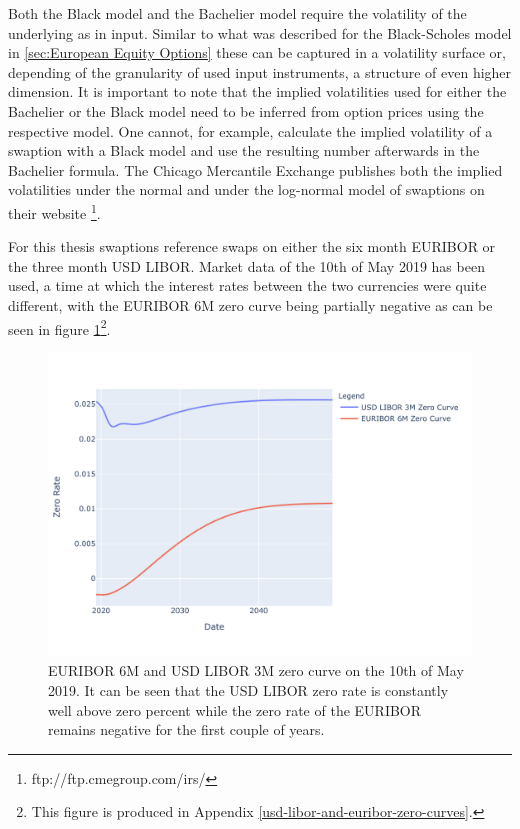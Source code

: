 \documentclass[../Thesis_AHoecherl.tex]{subfiles}
\begin{document}
    Both the Black model and the Bachelier model require the volatility of the underlying as in input. Similar to what was described for the Black-Scholes model in \ref{sec:European Equity Options} these can be captured in a volatility surface or, depending of the granularity of used input instruments, a structure of even higher dimension.
    It is important to note that the implied volatilities used for either the Bachelier or the Black model need to be inferred from option prices using the respective model.
    One cannot, for example, calculate the implied volatility of a swaption with a Black model and use the resulting number afterwards in the Bachelier formula.
    The Chicago Mercantile Exchange publishes both the implied volatilities under the normal and under the log-normal model of swaptions on their website
    \footnote{ftp://ftp.cmegroup.com/irs/}.

    For this thesis swaptions reference swaps on either the six month \gls{EURIBOR} or the three month USD \gls{LIBOR}.
    Market data of the 10th of May 2019 has been used, a time at which the interest rates between the two currencies were quite different, with the \gls{EURIBOR} 6M zero curve being partially negative as can be seen in figure \ref{fig:EURIBOR and LIBOR forward curve}\footnote{This figure is produced in Appendix \ref{usd-libor-and-euribor-zero-curves}.}.

    \begin{figure}
        \centering
        \includegraphics{Graphics/EURIBOR_and_LIBOR_curve.pdf}
        \caption[EURIBOR 6M and USD LIBOR 3M zero curve]{\gls{EURIBOR} 6M and USD \gls{LIBOR} 3M zero curve on the 10th of May 2019. It can be seen that the USD \gls{LIBOR} zero rate is constantly well above zero percent while the zero rate of the \gls{EURIBOR} remains negative for the first couple of years.}
        \label{fig:EURIBOR and LIBOR forward curve}
    \end{figure} 
\end{document}
